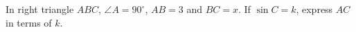 In right triangle $ABC$, $\angle A=90^\circ$, $AB=3$ and $BC=x$. If $\sin C=k$, express $AC$ in terms of $k$.
